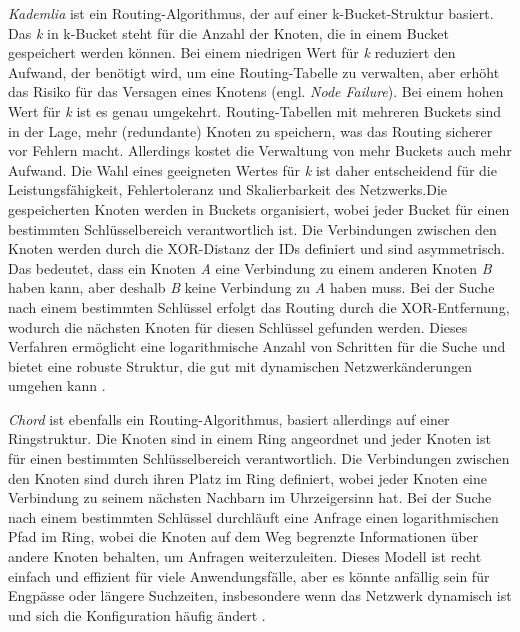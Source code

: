 \textit{Kademlia} ist ein Routing-Algorithmus, der auf einer k-Bucket-Struktur basiert. Das \textit{k} in k-Bucket steht für die Anzahl der Knoten, die in einem Bucket gespeichert werden können. Bei einem niedrigen Wert für \textit{k} reduziert den Aufwand, der benötigt wird, um eine Routing-Tabelle zu verwalten, aber erhöht das Risiko für das Versagen eines Knotens (engl. \textit{Node Failure}). Bei einem hohen Wert für \textit{k} ist es genau umgekehrt. Routing-Tabellen mit mehreren Buckets sind in der Lage, mehr (redundante) Knoten zu speichern, was das Routing sicherer vor Fehlern macht. Allerdings kostet die Verwaltung von mehr Buckets auch mehr Aufwand. Die Wahl eines geeigneten Wertes für \textit{k} ist daher entscheidend für die Leistungsfähigkeit, Fehlertoleranz und Skalierbarkeit des Netzwerks.Die gespeicherten Knoten werden in Buckets organisiert, wobei jeder Bucket für einen bestimmten Schlüsselbereich verantwortlich ist. Die Verbindungen zwischen den Knoten werden durch die XOR-Distanz der IDs definiert und sind asymmetrisch. Das bedeutet, dass ein Knoten  \textit{A} eine Verbindung zu einem anderen Knoten \textit{B} haben kann, aber deshalb \textit{B} keine Verbindung zu \textit{A} haben muss. Bei der Suche nach einem bestimmten Schlüssel erfolgt das Routing durch die XOR-Entfernung, wodurch die nächsten Knoten für diesen Schlüssel gefunden werden. Dieses Verfahren ermöglicht eine logarithmische Anzahl von Schritten für die Suche und bietet eine robuste Struktur, die gut mit dynamischen Netzwerkänderungen umgehen kann \parencite[S. 1-2]{Maymounkov_Kademlia}.

\textit{Chord} ist ebenfalls ein Routing-Algorithmus, basiert allerdings auf einer Ringstruktur. Die Knoten sind in einem Ring angeordnet und jeder Knoten ist für einen bestimmten Schlüsselbereich verantwortlich. Die Verbindungen zwischen den Knoten sind durch ihren Platz im Ring definiert, wobei jeder Knoten eine Verbindung zu seinem nächsten Nachbarn im Uhrzeigersinn hat. Bei der Suche nach einem bestimmten Schlüssel durchläuft eine Anfrage einen logarithmischen Pfad im Ring, wobei die Knoten auf dem Weg begrenzte Informationen über andere Knoten behalten, um Anfragen weiterzuleiten. Dieses Modell ist recht einfach und effizient für viele Anwendungsfälle, aber es könnte anfällig sein für Engpässe oder längere Suchzeiten, insbesondere wenn das Netzwerk dynamisch ist und sich die Konfiguration häufig ändert \parencite[S. 1-3]{Stoica_Chord}.

